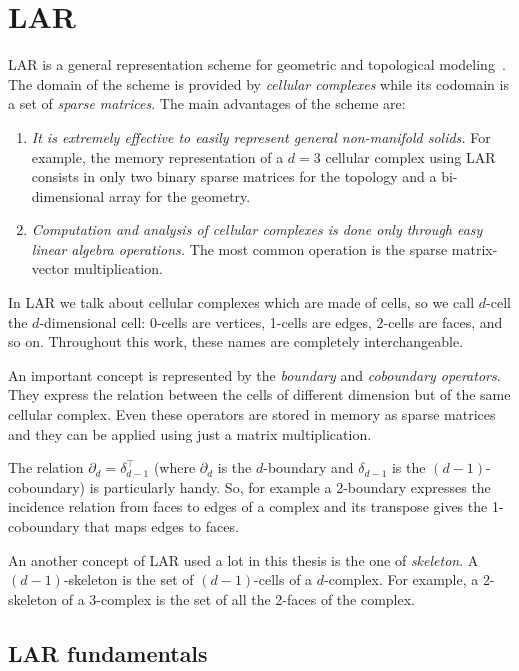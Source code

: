 \chapter{LAR}
\label{sec:LAR}

LAR is a general representation scheme for geometric and topological
modeling~\cite{Dicarlo:2014:TNL:2543138.2543294}. 
The domain of the scheme is provided by \textit{cellular complexes}
while its codomain is a set of \textit{sparse matrices}.
The main advantages of the scheme are:
\begin{enumerate}
    \item
    \textit{It is extremely effective to easily represent general non-manifold solids.}
    For example, the memory representation of a $d=3$ cellular complex using LAR 
    consists in only two binary sparse matrices for the topology and a bi-dimensional
    array for the geometry.
    \item
    \textit{Computation and analysis of cellular complexes is
    done only through easy linear algebra operations.} 
    The most common operation is the sparse matrix-vector 
    multiplication.
\end{enumerate}

In LAR we talk about cellular complexes which are made of cells, so we
call $d$-cell the $d$-dimensional cell: 0-cells are vertices,
1-cells are edges, 2-cells are faces, and so on.
Throughout this work, these names are completely
interchangeable.

An important concept is represented by the \textit{boundary} and 
\textit{coboundary operators}. They express the relation
between the cells of different dimension but of the same cellular complex.
Even these operators are stored in memory as sparse matrices 
and they can be applied using just a matrix multiplication.

The relation $\partial_d = \delta_{d-1}^\top$ (where $\partial_d$ 
is the $d$-boundary and $\delta_{d-1}$ is the $(d-1)$-coboundary)
is particularly handy. So, for example a 2-boundary expresses 
the incidence relation from faces to edges of a complex and
its transpose gives the 1-coboundary that maps edges to faces.

An another concept of LAR used a lot in this thesis is the one of
\textit{skeleton}. A $(d-1)$-skeleton is the set of $(d-1)$-cells of
a $d$-complex. For example, a 2-skeleton of a 3-complex is the set
of all the 2-faces of the complex.

\section{LAR fundamentals}
\label{sec:fundamentals}

